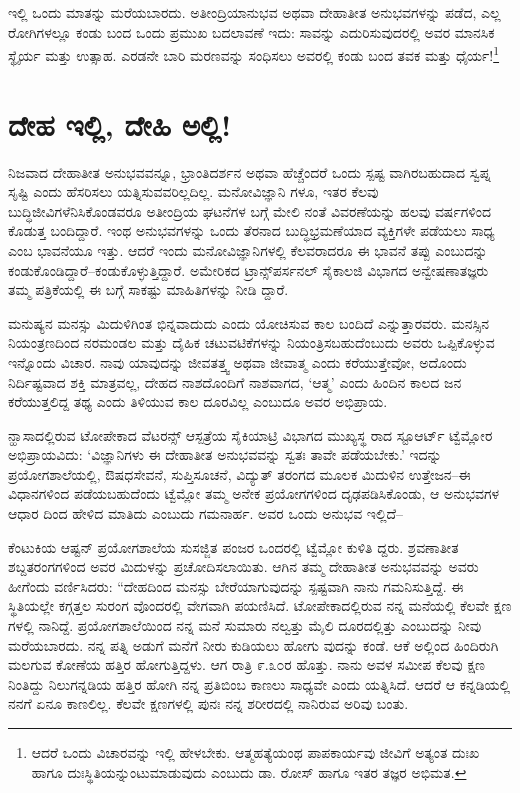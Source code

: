 ಇಲ್ಲಿ ಒಂದು ಮಾತನ್ನು ಮರೆಯಬಾರದು. ಅತೀಂದ್ರಿಯಾನುಭವ ಅಥವಾ ದೇಹಾತೀತ ಅನುಭವಗಳನ್ನು ಪಡೆದ, ಎಲ್ಲ ರೋಗಿಗಳಲ್ಲೂ ಕಂಡು ಬಂದ ಒಂದು ಪ್ರಮುಖ ಬದಲಾವಣೆ ಇದು: ಸಾವನ್ನು ಎದುರಿಸುವುದರಲ್ಲಿ ಅವರ ಮಾನಸಿಕ ಸ್ಥೈರ್ಯ ಮತ್ತು ಉತ್ಸಾಹ. ಎರಡನೇ ಬಾರಿ ಮರಣವನ್ನು ಸಂಧಿಸಲು ಅವರಲ್ಲಿ ಕಂಡು ಬಂದ ತವಕ ಮತ್ತು ಧೈರ್ಯ!\footnote{ ಆದರೆ ಒಂದು ವಿಚಾರವನ್ನು ಇಲ್ಲಿ ಹೇಳಬೇಕು. ಆತ್ಮಹತ್ಯೆಯಂಥ ಪಾಪಕಾರ್ಯವು ಜೀವಿಗೆ ಅತ್ಯಂತ ದುಃಖ ಹಾಗೂ ದುಃಸ್ಥಿತಿಯನ್ನುಂಟುಮಾಡುವುದು ಎಂಬುದು ಡಾ. ರೋಸ್ ಹಾಗೂ ಇತರ ತಜ್ಞರ ಅಭಿಮತ.}


\section{ದೇಹ ಇಲ್ಲಿ, ದೇಹಿ ಅಲ್ಲಿ!}

ನಿಜವಾದ ದೇಹಾತೀತ ಅನುಭವವನ್ನೂ, ಭ್ರಾಂತಿದರ್ಶನ ಅಥವಾ ಹೆಚ್ಚೆಂದರೆ ಒಂದು ಸ್ಪಷ್ಟ ವಾಗಿರಬಹುದಾದ ಸ್ವಪ್ನ ಸೃಷ್ಟಿ ಎಂದು ಹೆಸರಿಸಲು ಯತ್ನಿಸುವವರಿಲ್ಲದಿಲ್ಲ. ಮನೋವಿಜ್ಞಾನಿ ಗಳೂ, ಇತರ ಕೆಲವು ಬುದ್ಧಿಜೀವಿಗಳೆನಿಸಿಕೊಂಡವರೂ ಅತೀಂದ್ರಿಯ ಘಟನೆಗಳ ಬಗ್ಗೆ ಮೇಲಿ ನಂತೆ ವಿವರಣೆಯನ್ನು ಹಲವು ವರ್ಷಗಳಿಂದ ಕೊಡುತ್ತ ಬಂದಿದ್ದಾರೆ. ಇಂಥ ಅನುಭವಗಳನ್ನು ಒಂದು ತೆರನಾದ ಬುದ್ಧಿಭ್ರಮಣೆಯಾದ ವ್ಯಕ್ತಿಗಳೇ ಪಡೆಯಲು ಸಾಧ್ಯ ಎಂಬ ಭಾವನೆಯೂ ಇತ್ತು. ಆದರೆ ಇಂದು ಮನೋವಿಜ್ಞಾನಿಗಳಲ್ಲಿ ಕೆಲವರಾದರೂ ಈ ಭಾವನೆ ತಪ್ಪು ಎಂಬುದನ್ನು ಕಂಡುಕೊಂಡಿದ್ದಾರೆ–ಕಂಡುಕೊಳ್ಳುತ್ತಿದ್ದಾರೆ. ಅಮೇರಿಕದ ಟ್ರಾನ್ಸ್​ಪರ್ಸನಲ್ ಸೈಕಾಲಜಿ ವಿಭಾಗದ ಅನ್ವೇಷಣಾತಜ್ಞರು ತಮ್ಮ ಪತ್ರಿಕೆಯಲ್ಲಿ ಈ ಬಗ್ಗೆ ಸಾಕಷ್ಟು ಮಾಹಿತಿಗಳನ್ನು ನೀಡಿ ದ್ದಾರೆ.

ಮನುಷ್ಯನ ಮನಸ್ಸು ಮಿದುಳಿಗಿಂತ ಭಿನ್ನವಾದುದು ಎಂದು ಯೋಚಿಸುವ ಕಾಲ ಬಂದಿದೆ ಎನ್ನುತ್ತಾರವರು. ಮನಸ್ಸಿನ ನಿಯಂತ್ರಣದಿಂದ ನರಮಂಡಲ ಮತ್ತು ದೈಹಿಕ ಚಟುವಟಿಕೆಗಳನ್ನು ನಿಯಂತ್ರಿಸಬಹುದೆಂಬುದು ಅವರು ಒಪ್ಪಿಕೊಳ್ಳುವ ಇನ್ನೊಂದು ವಿಚಾರ. ನಾವು ಯಾವುದನ್ನು ಜೀವತತ್ತ್ವ ಅಥವಾ ಜೀವಾತ್ಮ ಎಂದು ಕರೆಯುತ್ತೇವೋ, ಅದೊಂದು ನಿರ್ದಿಷ್ಟವಾದ ಶಕ್ತಿ ಮಾತ್ರವಲ್ಲ, ದೇಹದ ನಾಶದೊಂದಿಗೆ ನಾಶವಾಗದ, ‘ಆತ್ಮ’ ಎಂದು ಹಿಂದಿನ ಕಾಲದ ಜನ ಕರೆಯುತ್ತಲಿದ್ದ ತಥ್ಯ ಎಂದು ತಿಳಿಯುವ ಕಾಲ ದೂರವಿಲ್ಲ ಎಂಬುದೂ ಅವರ ಅಭಿಪ್ರಾಯ.

ನ್ಹಾಸಾದಲ್ಲಿರುವ ಟೋಪೇಕಾದ ವೆಟರನ್ಸ್ ಆಸ್ಪತ್ರೆಯ ಸೈಕಿಯಾಟ್ರಿ ವಿಭಾಗದ ಮುಖ್ಯಸ್ಥ ರಾದ ಸ್ಟೂಆರ್ಟ್ ಟ್ವೆಮ್ಲೋರ ಅಭಿಪ್ರಾಯವಿದು: ‘ವಿಜ್ಞಾನಿಗಳು ಈ ದೇಹಾತೀತ ಅನುಭವವನ್ನು ಸ್ವತಃ ತಾವೇ ಪಡೆಯಬೇಕು.’ ಇದನ್ನು ಪ್ರಯೋಗಶಾಲೆಯಲ್ಲಿ, ಔಷಧಸೇವನೆ, ಸುಪ್ತಿಸೂಚನೆ, ವಿದ್ಯುತ್ ತರಂಗದ ಮೂಲಕ ಮಿದುಳಿನ ಉತ್ತೇಜನ–ಈ ವಿಧಾನಗಳಿಂದ ಪಡೆಯಬಹುದೆಂದು ಟ್ವೆಮ್ಲೋ ತಮ್ಮ ಅನೇಕ ಪ್ರಯೋಗಗಳಿಂದ ದೃಢಪಡಿಸಿಕೊಂಡು, ಆ ಅನುಭವಗಳ ಆಧಾರ ದಿಂದ ಹೇಳಿದ ಮಾತಿದು ಎಂಬುದು ಗಮನಾರ್ಹ. ಅವರ ಒಂದು ಅನುಭವ ಇಲ್ಲಿದೆ–

ಕೆಂಟುಕಿಯ ಆಷ್ಟನ್ ಪ್ರಯೋಗಶಾಲೆಯ ಸುಸಜ್ಜಿತ ಪಂಜರ ಒಂದರಲ್ಲಿ ಟ್ವೆಮ್ಲೋ ಕುಳಿತಿ ದ್ದರು. ಶ್ರವಣಾತೀತ ಶಬ್ದತರಂಗಗಳಿಂದ ಅವರ ಮಿದುಳನ್ನು ಪ್ರಚೋದಿಸಲಾಯಿತು. ಆಗಿನ ತಮ್ಮ ದೇಹಾತೀತ ಅನುಭವವನ್ನು ಅವರು ಹೀಗೆಂದು ವರ್ಣಿಸಿದರು: “ದೇಹದಿಂದ ಮನಸ್ಸು ಬೇರೆಯಾಗುವುದನ್ನು ಸ್ಪಷ್ಟವಾಗಿ ನಾನು ಗಮನಿಸುತ್ತಿದ್ದೆ. ಈ ಸ್ಥಿತಿಯಲ್ಲೇ ಕಗ್ಗತ್ತಲ ಸುರಂಗ ವೊಂದರಲ್ಲಿ ವೇಗವಾಗಿ ಪಯಣಿಸಿದೆ. ಟೋಪೇಕಾದಲ್ಲಿರುವ ನನ್ನ ಮನೆಯಲ್ಲಿ ಕೆಲವೇ ಕ್ಷಣ ಗಳಲ್ಲಿ ನಾನಿದ್ದೆ. ಪ್ರಯೋಗಶಾಲೆಯಿಂದ ನನ್ನ ಮನೆ ಸುಮಾರು ನಲ್ವತ್ತು ಮೈಲಿ ದೂರದಲ್ಲಿತ್ತು ಎಂಬುದನ್ನು ನೀವು ಮರೆಯಬಾರದು. ನನ್ನ ಪತ್ನಿ ಅಡುಗೆ ಮನೆಗೆ ನೀರು ಕುಡಿಯಲು ಹೋಗು ವುದನ್ನು ಕಂಡೆ. ಆಕೆ ಅಲ್ಲಿಂದ ಹಿಂದಿರುಗಿ ಮಲಗುವ ಕೋಣೆಯ ಹತ್ತಿರ ಹೋಗುತ್ತಿದ್ದಳು. ಆಗ ರಾತ್ರಿ ೯.೩೦ರ ಹೊತ್ತು. ನಾನು ಅವಳ ಸಮೀಪ ಕೆಲವು ಕ್ಷಣ ನಿಂತಿದ್ದು ನಿಲುಗನ್ನಡಿಯ ಹತ್ತಿರ ಹೋಗಿ ನನ್ನ ಪ್ರತಿಬಿಂಬ ಕಾಣಲು ಸಾಧ್ಯವೇ ಎಂದು ಯತ್ನಿಸಿದೆ. ಆದರೆ ಆ ಕನ್ನಡಿಯಲ್ಲಿ ನನಗೆ ಏನೂ ಕಾಣಲಿಲ್ಲ. ಕೆಲವೇ ಕ್ಷಣಗಳಲ್ಲಿ ಪುನಃ ನನ್ನ ಶರೀರದಲ್ಲಿ ನಾನಿರುವ ಅರಿವು ಬಂತು.

